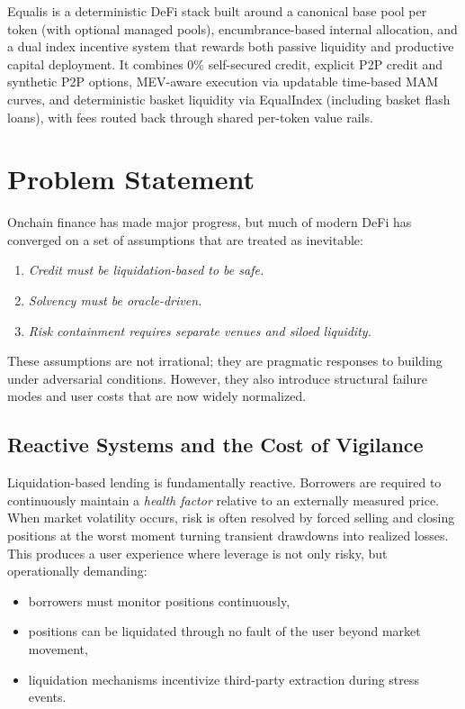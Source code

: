 \documentclass[version=preprint]{iacrcc}
\begin{document}
\begin{textabstract}
Equalis is a deterministic DeFi stack built around a canonical base pool per token (with optional managed pools), encumbrance-based internal allocation, and a dual index incentive system that rewards both passive liquidity and productive capital deployment. It combines 0\% self-secured credit, explicit P2P credit and synthetic P2P options, MEV-aware execution via updatable time-based MAM curves, and deterministic basket liquidity via EqualIndex (including basket flash loans), with fees routed back through shared per-token value rails.
\end{textabstract}

\section{Problem Statement}

Onchain finance has made major progress, but much of modern DeFi has converged on a set of assumptions that are treated as inevitable:
\begin{enumerate}
  \item \textit{Credit must be liquidation-based to be safe.}
  \item \textit{Solvency must be oracle-driven.}
  \item \textit{Risk containment requires separate venues and siloed liquidity.}
\end{enumerate}
These assumptions are not irrational; they are pragmatic responses to building under adversarial conditions. However, they also introduce structural failure modes and user costs that are now widely normalized.

\subsection{Reactive Systems and the Cost of Vigilance}

Liquidation-based lending is fundamentally reactive. Borrowers are required to continuously maintain a \textit{health factor} relative to an externally measured price. When market volatility occurs, risk is often resolved by forced selling and closing positions at the worst moment turning transient drawdowns into realized losses. This produces a user experience where leverage is not only risky, but operationally demanding:
\begin{itemize}
  \item borrowers must monitor positions continuously,
  \item positions can be liquidated through no fault of the user beyond market movement,
  \item liquidation mechanisms incentivize third-party extraction during stress events.
\end{itemize}
\end{document}
